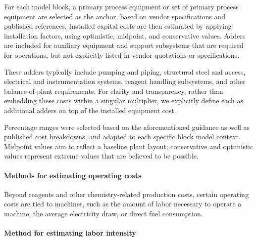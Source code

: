 For each model block, a primary process equipment or set of primary process equipment are selected as the anchor, based on vendor specifications and published references. Installed capital costs are then estimated by applying installation factors, using optimistic, midpoint, and conservative values. Adders are included for auxiliary equipment and support subsystems that are required for operations, but not explicitly listed in vendor quotations or specifications. 

These adders typically include pumping and piping, structural steel and access, electrical and instrumentation systems, reagent handling subsystems, and other balance-of-plant requirements. For clarity and transparency, rather than embedding these costs within a singular multiplier, we explicitly define each as additional adders on top of the installed equipment cost. 

Percentage ranges were selected based on the aforementioned guidance as well as published cost breakdowns, and adapted to each specific block model context. Midpoint values aim to reflect a baseline plant layout; conservative and optimistic values represent extreme values that are believed to be possible.

\paragraph{Methods for estimating operating costs}

Beyond reagents and other chemistry-related production costs, certain operating costs are tied to machines, such as the amount of labor necessary to operate a machine, the average electricity draw, or direct fuel consumption. 

\paragraph{Method for estimating labor intensity}\label{app:04-methods-machineblocks-labor}

